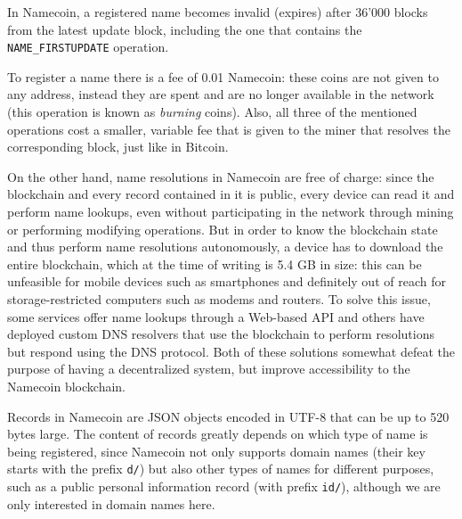 \documentclass[mscthesis]{usiinfthesis}
\begin{document}
In Namecoin, a registered name becomes invalid (expires) after 36'000 blocks from the latest update block, including the one that contains the \texttt{NAME\_FIRSTUPDATE} operation.

To register a name there is a fee of 0.01 Namecoin: these coins are not given to any address, instead they are spent and are no longer available in the network (this operation is known as \emph{burning} coins). Also, all three of the mentioned operations cost a smaller, variable fee that is given to the miner that resolves the corresponding block, just like in Bitcoin.

On the other hand, name resolutions in Namecoin are free of charge: since the blockchain and every record contained in it is public, every device can read it and perform name lookups, even without participating in the network through mining or performing modifying operations. But in order to know the blockchain state and thus perform name resolutions autonomously, a device has to download the entire blockchain, which at the time of writing is 5.4 GB in size: this can be unfeasible for mobile devices such as smartphones and definitely out of reach for storage-restricted computers such as modems and routers. To solve this issue, some services offer name lookups through a Web-based API and others have deployed custom DNS resolvers that use the blockchain to perform resolutions but respond using the DNS protocol. Both of these solutions somewhat defeat the purpose of having a decentralized system, but improve accessibility to the Namecoin blockchain.

Records in Namecoin are JSON objects encoded in UTF-8 that can be up to 520 bytes large. The content of records greatly depends on which type of name is being registered, since Namecoin not only supports domain names (their key starts with the prefix \texttt{d/}) but also other types of names for different purposes, such as a public personal information record (with prefix \texttt{id/}), although we are only interested in domain names here.
\end{document}
